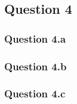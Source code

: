 \subsection{Question 4}
\label{subsec:414}

\subsubsection{Question 4.a}
\label{subsubsec:414a}

\subsubsection{Question 4.b}
\label{subsubsec:414b}

\subsubsection{Question 4.c}
\label{subsubsec:414c}